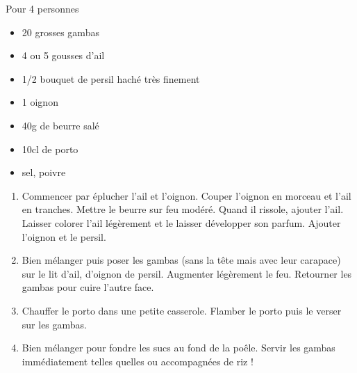 \bigskip
{}
{Pour 4 personnes}{\begin{itemize}
	\item 20 grosses gambas
	\item 4 ou 5 gousses d'ail
	\item 1/2 bouquet de persil haché très finement
	\item 1 oignon
	\item 40g de beurre salé
	\item 10cl de porto
	\item sel, poivre
\end{itemize}}
{\begin{enumerate}
	\item Commencer par éplucher l'ail et l'oignon. Couper l'oignon en morceau et l'ail en tranches. Mettre le beurre sur feu modéré. Quand il rissole, ajouter l'ail. Laisser colorer l'ail légèrement et le laisser développer son parfum. Ajouter l'oignon et le persil.
	\item Bien mélanger puis poser les gambas (sans la tête mais avec leur carapace) sur le lit d'ail, d'oignon de persil. Augmenter légèrement le feu. Retourner les gambas pour cuire l'autre face.
	\item Chauffer le porto dans une petite casserole. Flamber le porto puis le verser sur les gambas. 
	\item Bien mélanger pour fondre les sucs au fond de la poêle. Servir les gambas immédiatement telles quelles ou accompagnées de riz !
\end{enumerate}}

